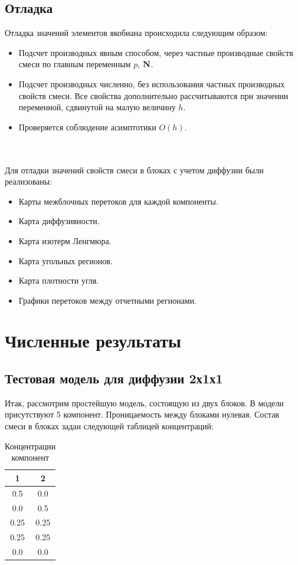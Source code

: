 \documentclass[12pt,a4paper]{article}
\begin{document}
\subsection{Отладка}
Отладка значений элементов якобиана происходила следующим образом: 
\begin{itemize}
 \item Подсчет производных явным способом, через частные производные свойств смеси по главным переменным $p$, $\bf N$. 
 \item Подсчет производных численно, без использования частных производных свойств смеси. Все свойства дополнительно рассчитываются 
 при значении переменной, сдвинутой на малую величину $h$.
 \item Проверяется соблюдение асимптотики $O(h)$. \\ \\ \\
\end{itemize}
Для отладки значений свойств смеси в блоках с учетом диффузии были реализованы:
\begin{itemize}
\item Карты межблочных перетоков для каждой компоненты.
\item Карта диффузивности.
\item Карта изотерм Ленгмюра.
\item Карта угольных регионов.
\item Карта плотности угля.
\item Графики перетоков между отчетными регионами.
\end{itemize}

\newpage
\section{Численные результаты}
\subsection {Тестовая модель для диффузии 2х1х1}
Итак, рассмотрим простейшую модель, состоящую из двух блоков. В модели присутствуют 5 компонент.
Проницаемость между блоками нулевая. Состав смеси в блоках задан следующей таблицей концентраций:
\begin{table}[!h]
\caption{Концентрации компонент}
\begin{center}
\begin{tabular}{|c|c|}
\hline
1 & 2 \\
\hline
0.5 & 0.0 \\
\hline
0.0 & 0.5 \\
\hline
0.25 & 0.25 \\
\hline
0.25 & 0.25 \\
\hline
0.0 & 0.0 \\
\hline
\end{tabular}
\end{center}
\end{table}
\end{document}
